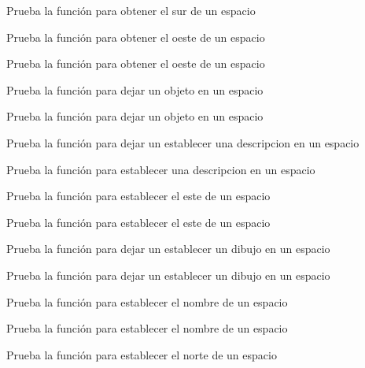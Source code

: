 \begin{DoxyRefList}
Prueba la función para obtener el sur de un espacio  
\item[\label{test__test000265}%
\Hypertarget{test__test000265}%
Member \hyperlink{space__test_8h_af1cf02b01c007aec0684186b39666c32}{test2\+\_\+space\+\_\+get\+\_\+west} ()]Prueba la función para obtener el oeste de un espacio 

Prueba la función para obtener el oeste de un espacio  
\item[\label{test__test000269}%
\Hypertarget{test__test000269}%
Member \hyperlink{space__test_8h_a5f23a9a66b003080f810ab44bed35560}{test2\+\_\+space\+\_\+leave\+\_\+object} ()]Prueba la función para dejar un objeto en un espacio 

Prueba la función para dejar un objeto en un espacio  
\item[\label{test__test000275}%
\Hypertarget{test__test000275}%
Member \hyperlink{space__test_8h_ab3dd07cbead60f87866e2bd2c426da0f}{test2\+\_\+space\+\_\+set\+\_\+description} ()]Prueba la función para dejar un establecer una descripcion en un espacio 

Prueba la función para establecer una descripcion en un espacio  
\item[\label{test__test000250}%
\Hypertarget{test__test000250}%
Member \hyperlink{space__test_8h_a5df66d103388be4518c379b224f53770}{test2\+\_\+space\+\_\+set\+\_\+east} ()]Prueba la función para establecer el este de un espacio 

Prueba la función para establecer el este de un espacio  
\item[\label{test__test000271}%
\Hypertarget{test__test000271}%
Member \hyperlink{space__test_8h_af40c7a664b529a39c3d98dca3d0af708}{test2\+\_\+space\+\_\+set\+\_\+gdesc} ()]Prueba la función para dejar un establecer un dibujo en un espacio 

Prueba la función para dejar un establecer un dibujo en un espacio  
\item[\label{test__test000243}%
\Hypertarget{test__test000243}%
Member \hyperlink{space__test_8h_a5a868ba017602ba6b58447cb394e81a6}{test2\+\_\+space\+\_\+set\+\_\+name} ()]Prueba la función para establecer el nombre de un espacio 

Prueba la función para establecer el nombre de un espacio  
\item[\label{test__test000246}%
\Hypertarget{test__test000246}%
Member \hyperlink{space__test_8h_a3bc7fe26c1e36ffd195099a9983206e1}{test2\+\_\+space\+\_\+set\+\_\+north} ()]Prueba la función para establecer el norte de un espacio 


\end{DoxyRefList}
